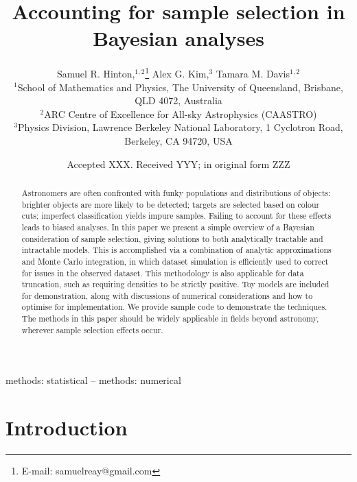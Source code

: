 \documentclass[a4paper,fleqn,usenatbib]{mnras}
\title[Accounting for sample selection in Bayesian analyses]{Accounting for sample selection in Bayesian analyses}
\author[S. R. Hinton et al.]{Samuel R. Hinton,$^{1,2}$\thanks{E-mail: samuelreay@gmail.com}
	Alex G. Kim,$^{3}$
	Tamara M. Davis$^{1,2}$
\\
$^{1}$School of Mathematics and Physics, The University of Queensland, Brisbane, QLD 4072, Australia\\
$^{2}$ARC Centre of Excellence for All-sky Astrophysics (CAASTRO)\\
$^{3}$Physics Division, Lawrence Berkeley National Laboratory, 1 Cyclotron Road, Berkeley, CA 94720, USA
}
\date{Accepted XXX. Received YYY; in original form ZZZ}
\begin{document}


\label{firstpage}
\pagerange{\pageref{firstpage}--\pageref{lastpage}}
\maketitle





\begin{abstract}
Astronomers are often confronted with funky populations and distributions of objects: brighter objects are more likely to be detected; targets are selected based on colour cuts; imperfect classification yields impure samples. Failing to account for these effects leads to biased analyses. In this paper we present a simple overview of a Bayesian consideration of sample selection, giving solutions to both analytically tractable and intractable models. This is accomplished via a combination of analytic approximations and Monte Carlo integration, in which dataset simulation is efficiently used to correct for issues in the observed dataset. This methodology is also applicable for data truncation, such as requiring densities to be strictly positive. Toy models are included for demonstration, along with discussions of numerical considerations and how to optimise for implementation.  We provide sample code to demonstrate the techniques. The methods in this paper should be widely applicable in fields beyond astronomy, wherever sample selection effects occur.
\end{abstract}



\begin{keywords}
	methods: statistical -- methods: numerical
\end{keywords}



\section{Introduction}
\end{document}
